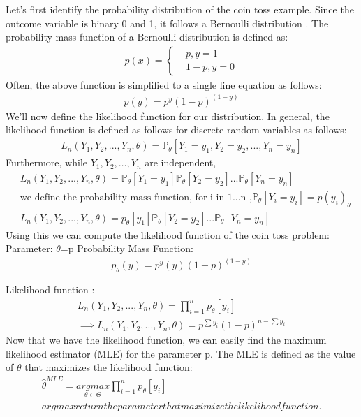 Let’s first identify the probability distribution of the coin toss example. Since the outcome variable is binary 0 and 1, it follows a Bernoulli distribution . 
The probability mass function of a Bernoulli distribution is
defined as:
\begin{align*}
    p(x) = \begin{cases}
                    &p,   y=1\\
                    &1-p, y=0 
            \end{cases}
\end{align*}
Often, the above function is simplified to a single line equation as follows:
\begin{align*}
    p(y) = p^y(1-p)^{(1-y)}
\end{align*}
We’ll now define the likelihood function for our distribution. In general, the likelihood function is defined as follows for discrete random variables as follows:
\begin{align*}
    L_n(Y_1,Y_2, ...,Y_n,\theta) = \mathbb{P}_\theta[Y_1=y_1,Y_2=y_2, ...,Y_n=y_n]
\end{align*}
Furthermore, while $Y_1, Y_2, …, Y_n$ are independent,
\begin{align*}
    &L_n(Y_1,Y_2, ...,Y_n,\theta) = \mathbb{P}_\theta[Y_1=y_1] \mathbb{P}_\theta[Y_2=y_2]...\mathbb{P}_\theta[Y_n=y_n]\\
    &\text{we define the probability mass function, for i in 1...n ,}\mathbb{P}_\theta[Y_i=y_i] = p(y_i)_\theta \\
    &L_n(Y_1,Y_2, ...,Y_n,\theta) = p_\theta[y_1] \mathbb{P}_\theta[Y_2=y_2]...\mathbb{P}_\theta[Y_n=y_n]
\end{align*}
Using this we can compute the likelihood function of the coin toss problem:
Parameter: $\theta$=p
Probability Mass Function:
\begin{align*}
    p_\theta(y) = p^y(y)(1-p)^{(1-y)}\\\\
\end{align*}
Likelihood function :
\begin{align*}
    L_n(Y_1,Y_2, ...,Y_n,\theta) = \prod_{i=1}^n  p_\theta[y_i] \\
\implies L_n(Y_1,Y_2, ...,Y_n,\theta) = p^{\sum y_i}(1-p)^{n-\sum y_i}
\end{align*}
Now that we have the likelihood function, we can easily find the maximum likelihood estimator (MLE) for the parameter p. The MLE  is defined as the value of $\theta$ that maximizes the likelihood function:
\begin{align*}
    \hat{\theta}^{MLE} = \underset{\theta\in\Theta}{argmax}\prod_{i=1}^n p_\theta[y_i]
    \\argmax return the parameter that maximize the likelihood function.
\end{align*}
